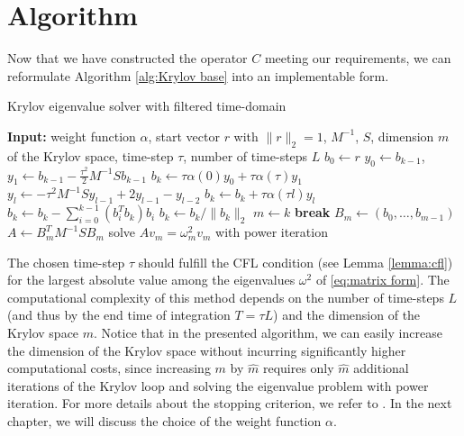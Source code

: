 \documentclass[a4paper,11pt,bibliography=totoc,listof=totoc,headinclude=true,cleardoublepage=empty,oneside]{scrbook}
\begin{document}
\section{Algorithm}
Now that we have constructed the operator $C$ meeting our requirements, we can reformulate Algorithm \ref{alg:Krylov base} into an implementable form.

\begin{algorithm}[H]
\caption{Krylov eigenvalue solver with filtered time-domain}\label{alg:Krylov pro}
   \begin{algorithmic}
        \State \textbf{Input: } weight function $\alpha$, start vector $r$ with $\|r\|_2 = 1$, $M^{-1}$, $S$, dimension $m$ of the Krylov space, time-step $\tau$, number of time-steps $L$
        \State $b_0 \gets r$
            \State $y_{0} \gets b_{k-1}$, $y_1 \gets b_{k-1} - \frac{\tau^2}{2}M^{-1}Sb_{k-1}$
            \State $b_k \gets \tau \alpha(0) y_0 + \tau\alpha(\tau)y_1$ 
                \State $y_l \gets -\tau^2 M^{-1}S y_{l-1} + 2y_{l-1} - y_{l-2}$ 
                \State $b_k \gets b_k + \tau \alpha(\tau l)y_l$ 
            \EndFor
            \State $b_k \gets b_k - \sum_{i=0}^{k-1}(b_i^Tb_k)b_i$ 
                \State $b_k\gets b_k/\|b_k\|_2$ 
            \Else
            \State $m\gets k$   
                \State \textbf{break} 
            \EndIf
        \EndFor
        \State $B_m \gets (b_0, \dots, b_{m-1})$ 
        \State $A \gets B_m^T M^{-1}S B_m$
        \State solve $Av_m = \omega_m^2 v_m$ with power iteration
    \end{algorithmic} 
\end{algorithm}

The chosen time-step $\tau$ should fulfill the CFL condition (see Lemma \ref{lemma:cfl}) for the largest absolute value among the eigenvalues $\omega^2$ of \eqref{eq:matrix form}. The computational complexity of this method depends on the number of time-steps $L$ (and thus by the end time of integration $T = \tau L$) and the dimension of the Krylov space $m$. Notice that in the presented algorithm, we can easily increase the dimension of the Krylov space without incurring significantly higher computational costs, since increasing $m$ by $\hat{m}$ requires only $\hat{m}$ additional iterations of the Krylov loop and solving the eigenvalue problem with power iteration. For more details about the stopping criterion, we refer to \cite[p. 8--9]{nannen}. In the next chapter, we will discuss the choice of the weight function $\alpha$.
\end{document}
